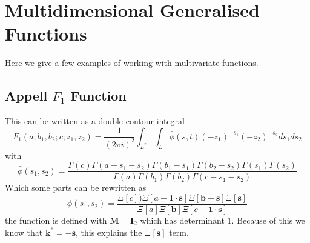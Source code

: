 \documentclass{article}
\begin{document}
\section{Multidimensional Generalised Functions}
Here we give a few examples of working with multivariate functions.

\subsection{Appell $F_1$ Function}
This can be written as a double contour integral
\begin{equation}
F_1(a;b_1,b_2;c;z_1,z_2) = \frac{1}{(2\pi i)^2}\int_{L^*} \int_L  \bar{\phi}(s,t) (-z_1)^{-s_1}(-z_2)^{-s_2} ds_1 ds_2
\end{equation}
with \begin{equation}
\bar{\phi}(s_1,s_2) = \frac{\Gamma(c)\Gamma(a-s_1-s_2)\Gamma(b_1-s_1)\Gamma(b_2-s_2)\Gamma(s_1)\Gamma(s_2)}{\Gamma(a)\Gamma(b_1)\Gamma(b_2)\Gamma(c-s_1-s_2)}
\end{equation}
Which some parts can be rewritten as 
\begin{equation}
\bar{\phi}(s_1,s_2) = \frac{\Xi[c])\Xi[a-\mathbf{1}\cdot\mathbf{s}]\Xi[\mathbf{b}-\mathbf{s}]\Xi[\mathbf{s}]}{\Xi[a]\Xi[\mathbf{b}]\Xi[c-\mathbf{1}\cdot\mathbf{s}]}
\end{equation}
the function is defined with $\mathbf{M}=\mathbf{I}_2$ which has determinant $1$. Because of this we know that $\mathbf{k}^* = -\mathbf{s}$, this explains the $\Xi[\mathbf{s}]$ term.
\end{document}
